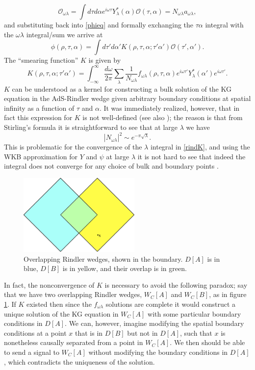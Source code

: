\documentclass[12pt]{article}
\newcommand{\be}{\begin{equation}}
\newcommand{\ee}{\end{equation}}
\newcommand{\mO}{\mathcal{O}}
\begin{document}
\be
\mO_{\omega \lambda} = \int d\tau d\alpha e^{i \omega \tau}Y_\lambda^*(\alpha)\mO(\tau,\alpha)=N_{\omega \lambda} a_{\omega \lambda},
\ee
and substituting back into \eqref{phieq} and formally exchanging the $\tau\alpha$ integral with the $\omega \lambda$ integral/sum we arrive at
\be
\phi(\rho,\tau,\alpha)=\int d\tau' d\alpha' K(\rho,\tau,\alpha; \tau'\alpha') \mO(\tau',\alpha').
\ee
The ``smearing function'' $K$ is given by
\be\label{rindK}
K(\rho,\tau,\alpha; \tau'\alpha')=\int_{-\infty}^\infty \frac{d\omega}{2\pi}\sum_\lambda \frac{1}{N_{\omega \lambda}}f_{\omega \lambda}(\rho,\tau,\alpha)e^{i\omega \tau'}Y^*_\lambda(\alpha')e^{i\omega \tau'}.
\ee
$K$ can be understood as a kernel for constructing a bulk solution of the KG equation in the AdS-Rindler wedge given arbitrary boundary conditions at spatial infinity as a function of $\tau$ and $\alpha$.  It was immediately realized, however, that in fact this expression for $K$ is not well-defined \cite{Hamilton:2006az} (see also \cite{Leichenauer:2013kaa,Rey:2014dpa}); the reason is that from Stirling's formula it is straightforward to see that at large $\lambda$ we have
\be
|N_{\omega \lambda}|^2\sim e^{-\pi \sqrt{\lambda}}.
\ee 
This is problematic for the convergence of the $\lambda$ integral in \eqref{rindK}, and using the WKB approximation for $Y$ and $\psi$ at large $\lambda$ it is not hard to see that indeed the integral does not converge for any choice of bulk and boundary points \cite{Leichenauer:2013kaa,Rey:2014dpa,Morrison:2014jha}.

\begin{figure}
\begin{center}
\includegraphics[height=4cm]{overlap.pdf}
\caption{Overlapping Rindler wedges, shown in the boundary.  $D[A]$ is in blue, $D[B]$ is in yellow, and their overlap is in green.}\label{overlap}
\end{center}
\end{figure}
In fact, the nonconvergence of $K$ is necessary to avoid the following paradox; say that we have two overlapping Rindler wedges, $W_C[A]$ and $W_C[B]$, as in figure \ref{overlap}.  If $K$ existed then since the $f_{\omega\lambda}$ solutions are complete it would construct a unique solution of the KG equation in $W_C[A]$ with some particular boundary conditions in $D[A]$.  We can, however, imagine modifying the spatial boundary conditions at a point $x$ that is in $D[B]$ but not in $D[A]$, such that $x$ is nonetheless causally separated from a point in $W_C[A]$.  We then should be able to send a signal to $W_C[A]$ without modifying the boundary conditions in $D[A]$, which contradicts the uniqueness of the solution.  
\end{document}
